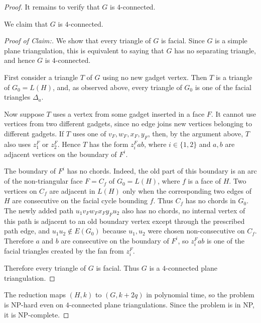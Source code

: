 \documentclass{patmorin}
\newenvironment{clmproof}{\begin{proof}[Proof of Claim:]\renewcommand{\qedsymbol}{\rule{1ex}{1ex}}}{\end{proof}}
\begin{document}
\begin{proof}
It remains to verify that $G$ is $4$-connected.

\begin{clm}
We claim that $G$ is $4$-connected.
\end{clm}
\begin{clmproof}
We show that every
triangle of $G$ is facial.  Since $G$ is a simple plane triangulation,
this is equivalent to saying that $G$ has no separating triangle, and
hence $G$ is $4$-connected.

First consider a triangle $T$ of $G$ using no new gadget vertex.  Then
$T$ is a triangle of $G_0=L(H)$, and, as observed above, every
triangle of $G_0$ is one of the facial triangles $\Delta_a$.

Now suppose $T$ uses a vertex from some gadget inserted in a face
$F$.  It cannot use vertices from two different gadgets, since no edge
joins new vertices belonging to different gadgets.  If $T$ uses one of
$v_F,w_F,x_F,y_F$, then, by the argument above, $T$ also uses
$z_1^F$ or $z_2^F$.  Hence $T$ has the form $z_i^F ab$,
where $i \in \{1,2\}$ and $a,b$ are adjacent vertices on the boundary
of $F^i$.

The boundary of $F^i$ has no chords.  Indeed, the old part of this
boundary is an arc of the non-triangular face $F=C_f$ of $G_0=L(H)$,
where $f$ is a face of $H$.  Two vertices on $C_f$ are adjacent in $L(H)$ only when the corresponding two edges of $H$ are consecutive on the facial cycle bounding $f$.  
Thus $C_f$ has no chords in $G_0$.  
The newly added path $u_1 v_F w_F x_F y_F u_2$
also has no chords, no internal vertex of this path is adjacent to an old boundary vertex except through the prescribed path edge, and $u_1u_2 \notin E(G_0)$ because $u_1,u_2$ were chosen non-consecutive on $C_f$.  
Therefore $a$ and $b$ are consecutive on the boundary of
$F^i$, so $z_i^F ab$ is one of the facial triangles created by the fan from $z_i^F$.

Therefore every triangle of $G$ is facial.  Thus $G$ is a
$4$-connected plane triangulation. 
\end{clmproof}
The reduction maps $(H,k)$ to
$(G,k+2q)$ in polynomial time, so the problem is NP-hard even on $4$-connected plane triangulations.  Since the problem is in NP, it is NP-complete.
\end{proof}
\end{document}
